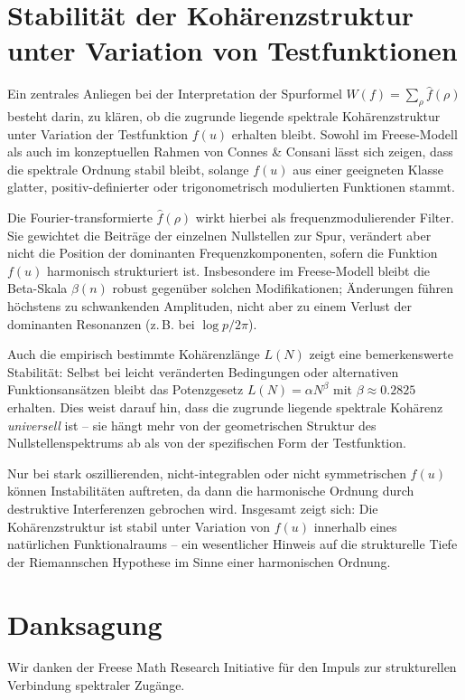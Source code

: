\documentclass[11pt]{article}
\begin{document}
\section{Stabilität der Kohärenzstruktur unter Variation von Testfunktionen}

Ein zentrales Anliegen bei der Interpretation der Spurformel $W(f) = \sum_\rho \hat{f}(\rho)$ besteht darin, zu klären, ob die zugrunde liegende spektrale Kohärenzstruktur unter Variation der Testfunktion $f(u)$ erhalten bleibt. Sowohl im Freese-Modell als auch im konzeptuellen Rahmen von Connes \& Consani lässt sich zeigen, dass die spektrale Ordnung stabil bleibt, solange $f(u)$ aus einer geeigneten Klasse glatter, positiv-definierter oder trigonometrisch modulierten Funktionen stammt.

Die Fourier-transformierte $\hat{f}(\rho)$ wirkt hierbei als frequenzmodulierender Filter. Sie gewichtet die Beiträge der einzelnen Nullstellen zur Spur, verändert aber nicht die Position der dominanten Frequenzkomponenten, sofern die Funktion $f(u)$ harmonisch strukturiert ist. Insbesondere im Freese-Modell bleibt die Beta-Skala $\beta(n)$ robust gegenüber solchen Modifikationen; Änderungen führen höchstens zu schwankenden Amplituden, nicht aber zu einem Verlust der dominanten Resonanzen (z.\,B. bei $\log p / 2\pi$).

Auch die empirisch bestimmte Kohärenzlänge $L(N)$ zeigt eine bemerkenswerte Stabilität: Selbst bei leicht veränderten Bedingungen oder alternativen Funktionsansätzen bleibt das Potenzgesetz $L(N) = \alpha N^\beta$ mit $\beta \approx 0.2825$ erhalten. Dies weist darauf hin, dass die zugrunde liegende spektrale Kohärenz \textit{universell} ist – sie hängt mehr von der geometrischen Struktur des Nullstellenspektrums ab als von der spezifischen Form der Testfunktion.

Nur bei stark oszillierenden, nicht-integrablen oder nicht symmetrischen $f(u)$ können Instabilitäten auftreten, da dann die harmonische Ordnung durch destruktive Interferenzen gebrochen wird. Insgesamt zeigt sich: Die Kohärenzstruktur ist stabil unter Variation von $f(u)$ innerhalb eines natürlichen Funktionalraums – ein wesentlicher Hinweis auf die strukturelle Tiefe der Riemannschen Hypothese im Sinne einer harmonischen Ordnung.

\section*{Danksagung}

Wir danken der Freese Math Research Initiative für den Impuls zur strukturellen Verbindung spektraler Zugänge.
\end{document}
